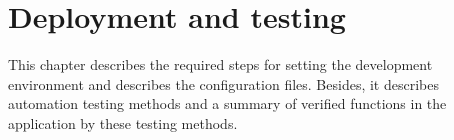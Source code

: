 \chapter{Deployment and testing}\label{ch:mobile-application-implementation}

This chapter describes the required steps for setting the development environment and describes the configuration files.
Besides, it describes automation testing methods and a summary of verified functions in the application by these testing methods.






